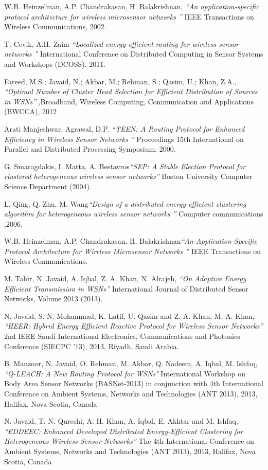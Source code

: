 \documentclass[journal]{IEEEtran}
\begin{document}
\begin{thebibliography}{1}
   W.B. Heinzelman, A.P. Chandrakasan, H. Balakrishnan,  {\em ``An application-specific protocol architecture for wireless microsensor networks ''} IEEE Transactions on Wireless Communications, 2002.

    T. Cevik, A.H. Zaim {\em ``Localized energy efficient routing for wireless sensor networks '' } International Conference on Distributed Computing in Sensor Systems and Workshops (DCOSS), 2011.

    Fareed, M.S.; Javaid, N.; Akbar, M.; Rehman, S.; Qasim, U.; Khan, Z.A., {\em ``Optimal Number of Cluster Head Selection for Efficient Distribution of Sources in WSNs''} ,Broadband, Wireless Computing, Communication and Applications (BWCCA), 2012

    Arati Manjeshwar, Agrawal, D.P. {\em ``TEEN: A Routing Protocol for Enhanced Efficiency in Wireless Sensor Networks '' } Proceedings 15th International on Parallel and Distributed Processing Symposium, 2000.


    G. Smaragdakis, I. Matta, A. Bestavros{\em ``SEP: A Stable Election Protocol for clustered heterogeneous wireless sensor networks''} Boston University Computer Science Department (2004).

    L. Qing, Q. Zhu, M. Wang{\em ``Design of a distributed energy-efficient clustering algorithm for heterogeneous wireless sensor networks '' } Computer communications ,2006.

     W.B. Heinzelman, A.P. Chandrakasan, H. Balakrishnan{\em ``An Application-Specific Protocol Architecture for Wireless Microsensor Networks '' } IEEE Transactions on Wireless Communications.

    M. Tahir, N. Javaid, A. Iqbal, Z. A. Khan, N. Alrajeh, {\em ``On Adaptive Energy Efficient Transmission in WSNs''} International Journal of Distributed Sensor Networks, Volume 2013 (2013).

    N. Javaid, S. N. Mohammad, K. Latif, U. Qasim and Z. A. Khan, M. A. Khan, {\em ``HEER: Hybrid Energy Efficient Reactive Protocol for Wireless Sensor Networks''} 2nd IEEE Saudi International Electronics, Communications and Photonics Conference (SIECPC ’13), 2013, Riyadh, Saudi Arabia.

    B. Manzoor, N. Javaid, O. Rehman, M. Akbar, Q. Nadeem, A. Iqbal, M. Ishfaq, {\em ``Q-LEACH: A New Routing Protocol for WSNs"} International Workshop on Body Area Sensor Networks (BASNet-2013) in conjunction with 4th International Conference on Ambient Systems, Networks and Technologies (ANT 2013), 2013, Halifax, Nova Scotia, Canada

    N. Javaid, T. N. Qureshi, A. H. Khan, A. Iqbal, E. Akhtar and M. Ishfaq, {\em ``EDDEEC: Enhanced Developed Distributed Energy-Efficient Clustering for Heterogeneous Wireless Sensor Networks''} The 4th International Conference on Ambient Systems, Networks and Technologies (ANT 2013), 2013, Halifax, Nova Scotia, Canada

  \end{thebibliography}
\end{document}
